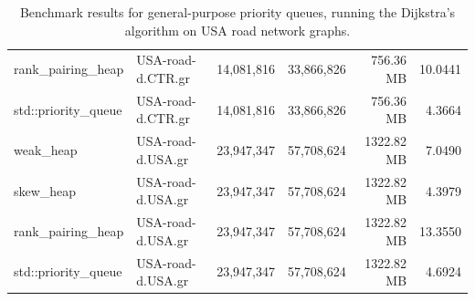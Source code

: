 \begin{table}[ht]
\begin{tabular}{|l|l|r|r|r|r|}
rank\_pairing\_heap & USA-road-d.CTR.gr  & 14,081,816 & 33,866,826  & 756.36 MB & 10.0441 \\
std::priority\_queue & USA-road-d.CTR.gr & 14,081,816 & 33,866,826  & 756.36 MB & 4.3664 \\
\hline
weak\_heap         & USA-road-d.USA.gr  & 23,947,347 & 57,708,624  & 1322.82 MB& 7.0490 \\
skew\_heap         & USA-road-d.USA.gr  & 23,947,347 & 57,708,624  & 1322.82 MB& 4.3979 \\
rank\_pairing\_heap & USA-road-d.USA.gr  & 23,947,347 & 57,708,624  & 1322.82 MB& 13.3550 \\
std::priority\_queue & USA-road-d.USA.gr & 23,947,347 & 57,708,624  & 1322.82 MB& 4.6924 \\
\hline
\end{tabular}
\caption{Benchmark results for general-purpose priority queues, running the Dijkstra's algorithm on USA road network graphs.}
\end{table}